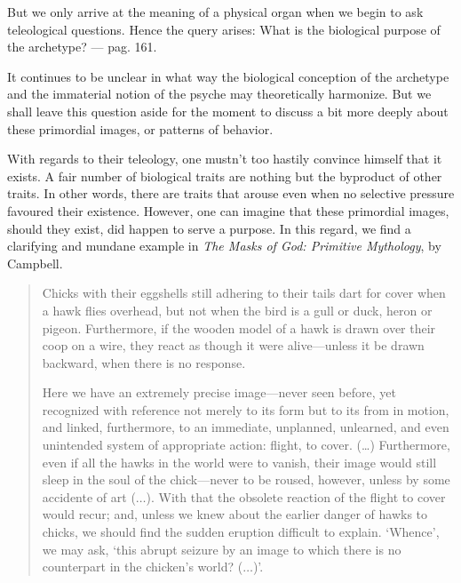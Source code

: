 \documentclass[a4paper]{article}
\begin{document}
    But we only arrive at the
    meaning of a physical organ when we begin to ask teleological questions.
    Hence the query arises: What is the biological purpose of the archetype? —
    pag. 161. 

    It continues to be unclear in what way the biological conception
    of the archetype and the immaterial notion of the psyche may theoretically
    harmonize. But we shall leave this question aside for the moment to discuss
    a bit more deeply about these primordial images, or patterns of behavior.

    With regards to their teleology, one mustn't too hastily convince himself
    that it exists. A fair number of biological traits are nothing but the
    byproduct of other traits. In other words, there are traits that arouse
    even when no selective pressure favoured their existence. However, one can
    imagine that these primordial images, should they exist, did happen to serve
    a purpose. In this regard, we find a clarifying and mundane example in
    \textit{The Masks of God: Primitive Mythology}, by Campbell. 

    \begin{quote}
        Chicks with their eggshells still adhering to their tails dart for
        cover when a hawk flies overhead, but not when the bird is a gull or
        duck, heron or pigeon. Furthermore, if the wooden model of a hawk is
        drawn over their coop on a wire, they react as though it were
        alive---unless it be drawn backward, when there is no response.

        Here we have an extremely precise image---never seen before, yet
        recognized with reference not merely to its form but to its from in
        motion, and linked, furthermore, to an immediate, unplanned, unlearned,
        and even unintended system of appropriate action: flight, to cover.
        (\ldots) Furthermore, even if all the hawks in the world were to
        vanish, their image would still sleep in the soul of the chick---never
        to be roused, however, unless by some accidente of art ($\ldots$). With
        that the obsolete reaction of the flight to cover would recur; and,
        unless we knew about the earlier danger of hawks to chicks, we should
        find the sudden eruption difficult to explain. \lq Whence\rq, we may
        ask, \lq this abrupt seizure by an image to which there is no
        counterpart in the chicken's world? ($\ldots$)\rq.
    \end{quote}
\end{document}

